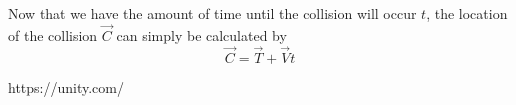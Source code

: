 \documentclass[12pt,a4paper]{report}
\begin{document}
Now that we have the amount of time until the collision will occur $t$, the location of the collision $\vec{C}$ can simply be calculated by  
\begin{equation}
	\vec{C} = \vec{T}+\vec{V}t
\end{equation}



\begin{thebibliography}{10}

 https://unity.com/

\end{thebibliography}
\end{document}
